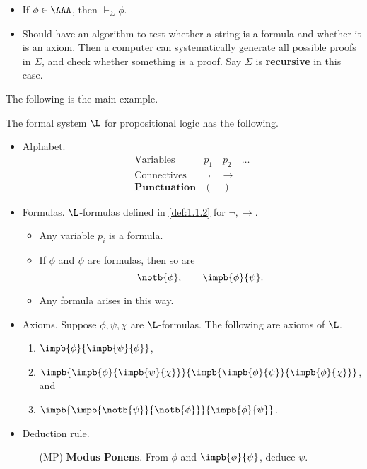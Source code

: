 \begin{remark*}
\hfill
\begin{itemize}
\item If $ \phi \in \AAA $, then $ \vdash_\Sigma \phi $.
\item Should have an algorithm to test whether a string is a formula and whether it is an axiom. Then a computer can systematically generate all possible proofs in $ \Sigma $, and check whether something is a proof. Say $ \Sigma $ is \textbf{recursive} in this case.
\end{itemize}
\end{remark*}

\pagebreak

The following is the main example.

\begin{definition}
The formal system $ \L $ for propositional logic has the following.
\begin{itemize}
\item Alphabet.
$$
\begin{array}{ll}
\text{Variables} & p_1 \quad p_2 \quad \dots \\
\text{Connectives} & \neg \quad \rightarrow \\
\textbf{Punctuation} & ( \quad )
\end{array}
$$
\item Formulas. $ \L $-formulas defined in \ref{def:1.1.2} for $ \neg, \rightarrow $.
\begin{itemize}
\item Any variable $ p_i $ is a formula.
\item If $ \phi $ and $ \psi $ are formulas, then so are
$$ \notb{\phi}, \qquad \impb{\phi}{\psi}. $$
\item Any formula arises in this way.
\end{itemize}
\item Axioms. Suppose $ \phi, \psi, \chi $ are $ \L $-formulas. The following are axioms of $ \L $.
\begin{enumerate}[label=(A\arabic*)]
\item $ \impb{\phi}{\impb{\psi}{\phi}} $,
\item $ \impb{\impb{\phi}{\impb{\psi}{\chi}}}{\impb{\impb{\phi}{\psi}}{\impb{\phi}{\chi}}} $, and
\item $ \impb{\impb{\notb{\psi}}{\notb{\phi}}}{\impb{\phi}{\psi}} $.
\end{enumerate}
\item Deduction rule.
\begin{itemize}
\item[(MP)] \textbf{Modus Ponens}. From $ \phi $ and $ \impb{\phi}{\psi} $, deduce $ \psi $.
\end{itemize}
\end{itemize}
\end{definition}

